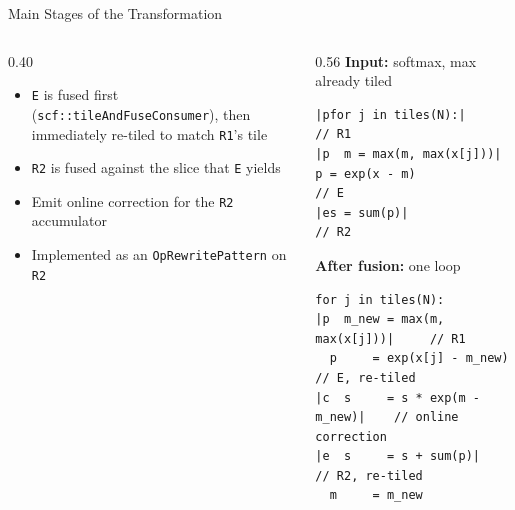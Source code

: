 \documentclass[10pt, aspectratio=169]{beamer}
\newcommand{\code}[1]{\texttt{\small #1}}
\begin{document}
\begin{frame}[fragile]{Main Stages of the Transformation}
  \centering

  \vspace{4mm}
  \raggedright
  \begin{columns}[c, onlytextwidth]
    \begin{column}{0.40\textwidth}
      \footnotesize
      \begin{itemize}
        \setlength{\itemsep}{1.5mm}
        \item \code{E} is fused first (\code{scf::tileAndFuseConsumer}), then
          immediately re-tiled to match \code{R1}'s tile
        \item \code{R2} is fused against the slice that \code{E} yields
        \item Emit online correction for the \code{R2} accumulator
        \item Implemented as an \code{OpRewritePattern} on \code{R2}
      \end{itemize}
      \vspace{4mm}  %
    \end{column}
    \begin{column}{0.56\textwidth}
      {\scriptsize\textbf{Input:} softmax, max already tiled}
\begin{lstlisting}
|pfor j in tiles(N):|              // R1
|p  m = max(m, max(x[j]))|
p = exp(x - m)                  // E
|es = sum(p)|                      // R2
\end{lstlisting}
      \vspace{1mm}
      {\scriptsize\textbf{After fusion:} one loop}
\begin{lstlisting}
for j in tiles(N):
|p  m_new = max(m, max(x[j]))|     // R1
  p     = exp(x[j] - m_new)     // E, re-tiled
|c  s     = s * exp(m - m_new)|    // online correction
|e  s     = s + sum(p)|            // R2, re-tiled
  m     = m_new
\end{lstlisting}
    \end{column}
  \end{columns}
\end{frame}
\end{document}
